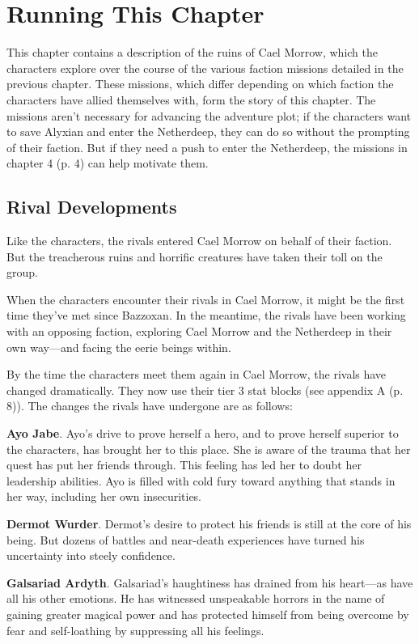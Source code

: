 \documentclass[letterpaper, 11pt, bg=full, twocolumn]{dndbook}
\begin{document}
\section{Running This Chapter}

This chapter contains a description of the ruins of Cael Morrow, which the characters explore over the course of the various faction missions detailed in the previous chapter. These missions, which differ depending on which faction the characters have allied themselves with, form the story of this chapter. The missions aren't necessary for advancing the adventure plot; if the characters want to save Alyxian and enter the Netherdeep, they can do so without the prompting of their faction. But if they need a push to enter the Netherdeep, the missions in chapter 4 (p. 4) can help motivate them.

\subsection{Rival Developments}

Like the characters, the rivals entered Cael Morrow on behalf of their faction. But the treacherous ruins and horrific creatures have taken their toll on the group.

When the characters encounter their rivals in Cael Morrow, it might be the first time they've met since Bazzoxan. In the meantime, the rivals have been working with an opposing faction, exploring Cael Morrow and the Netherdeep in their own way---and facing the eerie beings within.

By the time the characters meet them again in Cael Morrow, the rivals have changed dramatically. They now use their tier 3 stat blocks (see appendix A (p. 8)). The changes the rivals have undergone are as follows:

\textbf{Ayo Jabe}. Ayo's drive to prove herself a hero, and to prove herself superior to the characters, has brought her to this place. She is aware of the trauma that her quest has put her friends through. This feeling has led her to doubt her leadership abilities. Ayo is filled with cold fury toward anything that stands in her way, including her own insecurities.

\textbf{Dermot Wurder}. Dermot's desire to protect his friends is still at the core of his being. But dozens of battles and near-death experiences have turned his uncertainty into steely confidence.

\textbf{Galsariad Ardyth}. Galsariad's haughtiness has drained from his heart---as have all his other emotions. He has witnessed unspeakable horrors in the name of gaining greater magical power and has protected himself from being overcome by fear and self-loathing by suppressing all his feelings.
\end{document}
